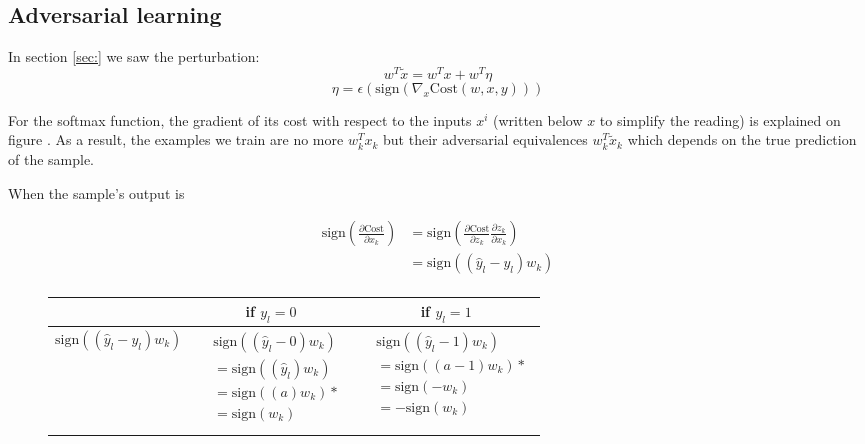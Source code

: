 	\subsection{Adversarial learning}
		In section \ref{sec:} we saw the perturbation:
		$$ w^T\tilde{x} = w^Tx + w^T\eta $$
		$$ \eta = \epsilon(\text{sign}(\nabla_x \text{Cost}(w,x,y))) $$

		For the softmax function, the gradient of its cost with respect to the inputs $x^i$ (written below $x$ to simplify the reading) is explained on figure . As a result, the examples we train are no more $w^T_k x_k$ but their adversarial equivalences $w^T_k \tilde{x}_k$ which depends on the true prediction of the sample.

		When the sample's output is 


		\begin{figure}
			\centering

			\begin{equation}
				\begin{split}
					\text{sign}\left( \frac{\partial \text{Cost}}{\partial x_k} \right)
					&= \text{sign}\left( \frac{\partial \text{Cost}}{\partial z_k} \frac{\partial z_k}{\partial x_k} \right)\\
					&= \text{sign}\left( (\hat{y}_l - y_l) w_k \right)\\
				\end{split}
			\end{equation}

			\begin{tabular}{c||c|c}
				& if $y_l = 0$ & if $y_l = 1$ \\
				\hline
				\hline

				$ \text{sign}\left( (\hat{y}_l - y_l) w_k \right) $ &
				\parbox{12em}{
					\begin{equation}
						\begin{split}
							&  \text{sign}\left( (\hat{y}_l - 0) w_k \right) \\
							&= \text{sign}\left( (\hat{y}_l) w_k \right) \\
							&= \text{sign}\left( (a) w_k \right) * \\
							&= \text{sign}\left( w_k \right) \\
						\end{split}
					\end{equation}
				} & \parbox{12em}{
				\begin{equation}
					\begin{split}
						&  \text{sign}\left( (\hat{y}_l -1) w_k \right) \\
						&= \text{sign}\left( (a-1) w_k \right) *\\
						&= \text{sign}\left( - w_k \right) \\
						&= - \text{sign}\left( w_k \right)
					\end{split}
				\end{equation}
				}\\
				\hline


\end{tabular}
\end{figure}
